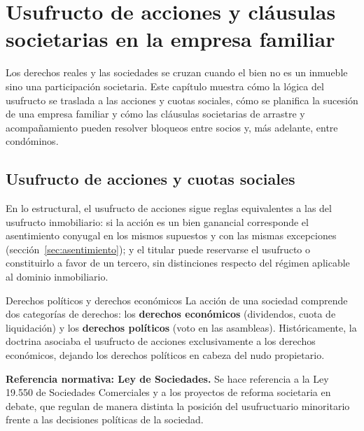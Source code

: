 \documentclass[12pt,oneside]{book}
\begin{document}
\chapter{Usufructo de acciones y cláusulas societarias en la empresa familiar}
\label{cap:empresafamiliar}

Los derechos reales y las sociedades se cruzan cuando el bien no es un inmueble sino una participación societaria. Este capítulo muestra cómo la lógica del usufructo se traslada a las acciones y cuotas sociales, cómo se planifica la sucesión de una empresa familiar y cómo las cláusulas societarias de arrastre y acompañamiento pueden resolver bloqueos entre socios y, más adelante, entre condóminos.

\section{Usufructo de acciones y cuotas sociales}
\label{sec:usufructoacciones}

En lo estructural, el usufructo de acciones sigue reglas equivalentes a las del usufructo inmobiliario: si la acción es un bien ganancial corresponde el asentimiento conyugal en los mismos supuestos y con las mismas excepciones (sección~\ref{sec:asentimiento}); y el titular puede reservarse el usufructo o constituirlo a favor de un tercero, sin distinciones respecto del régimen aplicable al dominio inmobiliario.

\begin{definition}{Derechos políticos y derechos económicos}
La acción de una sociedad comprende dos categorías de derechos: los \textbf{derechos económicos} (dividendos, cuota de liquidación) y los \textbf{derechos políticos} (voto en las asambleas). Históricamente, la doctrina asociaba el usufructo de acciones exclusivamente a los derechos económicos, dejando los derechos políticos en cabeza del nudo propietario.
\end{definition}

\begin{important}
\textbf{Referencia normativa: Ley de Sociedades.} Se hace referencia a la Ley 19.550 de Sociedades Comerciales y a los proyectos de reforma societaria en debate, que regulan de manera distinta la posición del usufructuario minoritario frente a las decisiones políticas de la sociedad.
\end{important}
\end{document}
